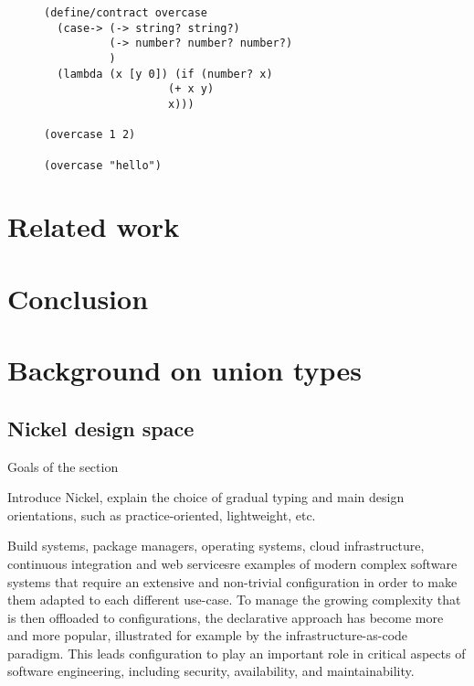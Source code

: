 \documentclass[sigplan,10pt,review,anonymous]{acmart}
\newcommand{\unsure}[2][1=]{}
\newcommand{\info}[2][1=]{}
\newcommand{\resolved}[2]{}
\begin{document}
\begin{figure}[h]

\begin{lstlisting}[language=racket]
(define/contract overcase
  (case-> (-> string? string?)
          (-> number? number? number?)
          )
  (lambda (x [y 0]) (if (number? x)
                   (+ x y)
                   x)))

(overcase 1 2)

(overcase "hello")
\end{lstlisting}
\end{figure}


\unsure{Todo}


\newpage

\section{Related work}
\info{Including a mention of statically typed systems with union}
\info{Include something about Racket's and and or contracts}

\newpage

\section{Conclusion}



\appendix


\section{Background on union types}

\subsection{Nickel design space}

{\color{red}Goals of the section

Introduce Nickel, explain the choice of gradual
typing and main design orientations, such as practice-oriented, lightweight,
etc.\vspace{0.5cm}}

Build systems, package managers, operating systems, cloud infrastructure,
continuous integration and web services\resolved{Also continuous integration}
are examples of modern complex software systems that require an extensive and
non-trivial configuration in order to make them adapted to each different
use-case. To manage the growing complexity that is then offloaded to
configurations, the declarative approach has become more and more popular,
illustrated for example by the infrastructure-as-code paradigm. This leads
configuration to play an important role in critical aspects of software
engineering, including security, availability, and maintainability.
\end{document}
